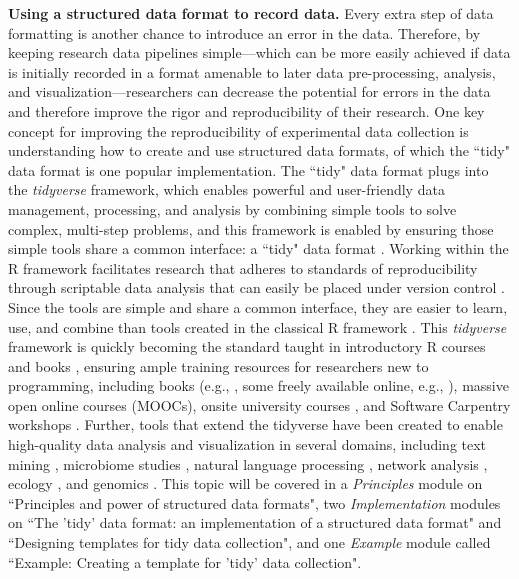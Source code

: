 \documentclass[pdftex,english,11pt,parskip=half]{scrartcl}
\begin{document}
\textbf{Using a structured data format to record data.} Every extra step of data
formatting is another chance to introduce an error in the data. Therefore, by
keeping research data pipelines simple---which can be more easily achieved if
data is initially recorded in a format amenable to later data pre-processing,
analysis, and visualization---researchers can decrease the potential for errors
in the data and therefore improve the rigor and reproducibility of their
research. One key concept for improving the reproducibility of experimental data
collection is understanding how to create and use structured data formats, of
which the ``tidy" data format is one popular implementation. The ``tidy" data
format plugs into the \textit{tidyverse} framework, which enables powerful and
user-friendly data management, processing, and analysis by combining simple
tools to solve complex, multi-step problems, and this framework is enabled by
ensuring those simple tools share a common interface: a ``tidy" data format
\cite{ross2017declutter, silge2016tidytext, wickham2016ggplot2, wickham2016r}.
Working within the R framework facilitates research that adheres to standards of
reproducibility through scriptable data analysis that can easily be placed under
version control \cite{bryan2017excuse}. Since the tools are simple and share a
common interface, they are easier to learn, use, and combine than tools created
in the classical R framework \cite{ross2017declutter, lowndes2017our,
reviewer2017review, mcnamara2016state}. This \textit{tidyverse} framework is
quickly becoming the standard taught in introductory R courses and books
\cite{hicks2017guide, baumer2015data, kaplan2017teaching, stander2017enthusing,
reviewer2017review, mcnamara2016state}, ensuring ample training resources for
researchers new to programming, including books (e.g., \cite{baumer2017modern,
lifesciencesR}, some freely available online, e.g., \cite{wickham2016r}),
massive open online courses (MOOCs), onsite university courses
\cite{baumer2015data, kaplan2017teaching, stander2017enthusing}, and Software
Carpentry workshops \cite{wilson2014software, pawlik2017developing}. Further,
tools that extend the tidyverse have been created to enable high-quality data
analysis and visualization in several domains, including text mining
\cite{silge2017text}, microbiome studies \cite{mcmurdie2013phyloseq}, natural
language processing \cite{RJ-2017-035}, network analysis \cite{RJ-2017-023},
ecology \cite{hsieh2016inext}, and genomics \cite{yin2012ggbio}. This topic will
be covered in a \textit{Principles} module on ``Principles and power of
structured data formats", two \textit{Implementation} modules on ``The 'tidy'
data format: an implementation of a structured data format" and ``Designing
templates for tidy data collection", and one \textit{Example} module called
``Example: Creating a template for 'tidy' data collection".
\end{document}
